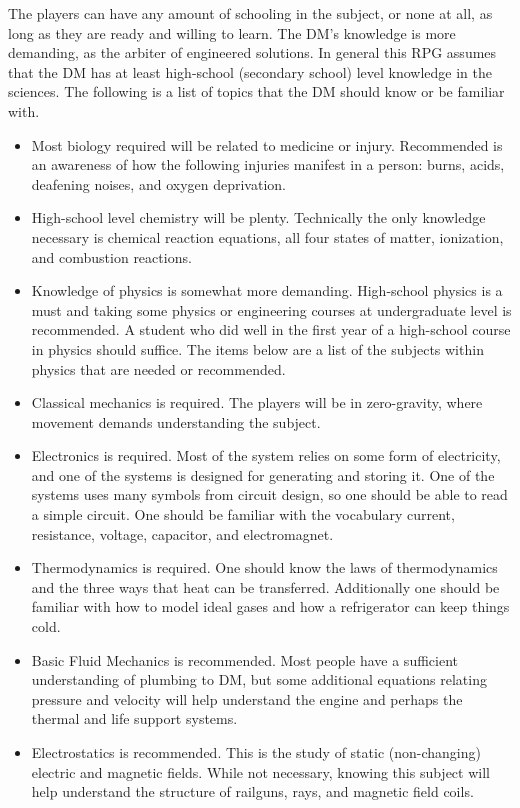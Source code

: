 \documentclass[a4paper]{article}
\begin{document}
The players can have any amount of schooling in the subject, or none at all, as long as they are ready and willing to learn. The DM's knowledge is more demanding, as the arbiter of engineered solutions. In general this RPG assumes that the DM has at least high-school (secondary school) level knowledge in the sciences. The following is a list of topics that the DM should know or be familiar with.
\begin{itemize}
\item Most biology required will be related to medicine or injury. Recommended is an awareness of how the following injuries manifest in a person: burns, acids, deafening noises, and oxygen deprivation.
\item High-school level chemistry will be plenty. Technically the only knowledge necessary is chemical reaction equations, all four states of matter, ionization, and combustion reactions.
\item Knowledge of physics is somewhat more demanding. High-school physics is a must and taking some physics or engineering courses at undergraduate level is recommended. A student who did well in the first year of a high-school course in physics should suffice. The items below are a list of the subjects within physics that are needed or recommended. 
\item Classical mechanics is required. The players will be in zero-gravity, where movement demands understanding the subject.
\item Electronics is required. Most of the system relies on some form of electricity, and one of the systems is designed for generating and storing it. One of the systems uses many symbols from circuit design, so one should be able to read a simple circuit. One should be familiar with the vocabulary current, resistance, voltage, capacitor, and electromagnet.
\item Thermodynamics is required. One should know the laws of thermodynamics and the three ways that heat can be transferred. Additionally one should be familiar with how to model ideal gases and how a refrigerator can keep things cold.
\item Basic Fluid Mechanics is recommended. Most people have a sufficient understanding of plumbing to DM, but some additional equations relating pressure and velocity will help understand the engine and perhaps the thermal and life support systems.
\item Electrostatics is recommended. This is the study of static (non-changing) electric and magnetic fields. While not necessary, knowing this subject will help understand the structure of railguns, rays, and magnetic field coils.
\end{itemize}
\end{document}
